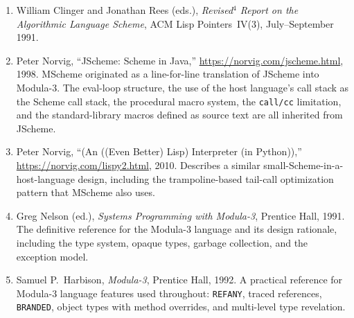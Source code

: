\documentclass[12pt]{report}
\begin{document}
\begin{enumerate}
\item William Clinger and Jonathan Rees (eds.),
  \emph{Revised$^4$ Report on the Algorithmic Language Scheme},
  ACM Lisp Pointers~IV(3), July--September 1991.

\item Peter Norvig, ``JScheme: Scheme in Java,''
  \url{https://norvig.com/jscheme.html}, 1998.
  MScheme originated as a line-for-line translation of JScheme into
  Modula-3.  The eval-loop structure, the use of the host language's
  call stack as the Scheme call stack, the procedural macro system,
  the \texttt{call/cc} limitation, and the standard-library macros
  defined as source text are all inherited from JScheme.

\item Peter Norvig, ``(An ((Even Better) Lisp) Interpreter (in Python)),''
  \url{https://norvig.com/lispy2.html}, 2010.
  Describes a similar small-Scheme-in-a-host-language design,
  including the trampoline-based tail-call optimization pattern
  that MScheme also uses.

\item Greg Nelson (ed.), \emph{Systems Programming with Modula-3},
  Prentice Hall, 1991.
  The definitive reference for the Modula-3 language and its design
  rationale, including the type system, opaque types, garbage
  collection, and the exception model.

\item Samuel P.\ Harbison, \emph{Modula-3}, Prentice Hall, 1992.
  A practical reference for Modula-3 language features used throughout:
  \texttt{REFANY}, traced references, \texttt{BRANDED}, object types
  with method overrides, and multi-level type revelation.
\end{enumerate}
\end{document}
